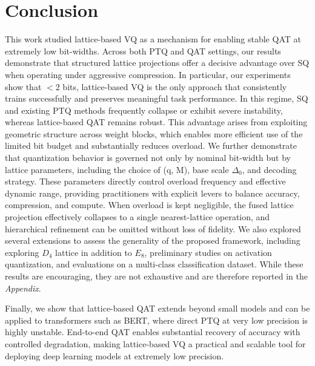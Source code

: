 \documentclass{article}
\theoremstyle{definition}
\theoremstyle{remark}
\begin{document}
\section{Conclusion}

This work studied lattice-based VQ as a mechanism for enabling stable QAT at extremely low bit-widths. Across both PTQ and QAT settings, our results demonstrate that structured lattice projections offer a decisive advantage over SQ when operating under aggressive compression.
In particular, our experiments show that $<$2 bits, lattice-based VQ is the only approach that consistently trains successfully and preserves meaningful task performance. In this regime, SQ and existing PTQ methods frequently collapse or exhibit severe instability, whereas lattice-based QAT remains robust. This advantage arises from exploiting geometric structure across weight blocks, which enables more efficient use of the limited bit budget and substantially reduces overload.
We further demonstrate that quantization behavior is governed not only by nominal bit-width but by lattice parameters, including the choice of (q, M), base scale $\Delta_0$, and decoding strategy. These parameters directly control overload frequency and effective dynamic range, providing practitioners with explicit levers to balance accuracy, compression, and compute. When overload is kept negligible, the fused lattice projection effectively collapses to a single nearest-lattice operation, and hierarchical refinement can be omitted without loss of fidelity.
{We also explored several extensions to assess the generality of the proposed framework, including exploring $D_4$ lattice in addition to $E_8$, preliminary studies on activation quantization, and evaluations on a multi-class classification dataset. While these results are encouraging, they are not exhaustive and are therefore reported in the \textit{Appendix}.}

Finally, we show that lattice-based QAT extends beyond small models and can be applied to transformers such as BERT, where direct PTQ at very low precision is highly unstable. End-to-end QAT enables substantial recovery of accuracy with controlled degradation, making lattice-based VQ a practical and scalable tool for deploying deep learning models at extremely low precision. 
\end{document}
